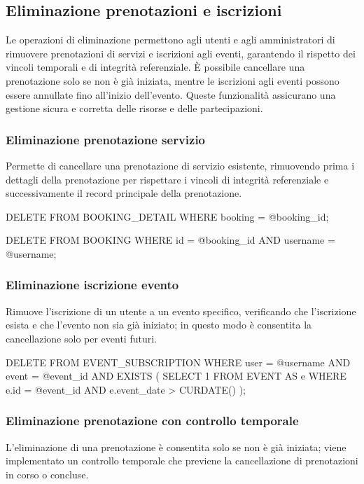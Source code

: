 \documentclass[a4paper,12pt]{report}
\begin{document}
\newpage
\subsection{Eliminazione prenotazioni e iscrizioni}
Le operazioni di eliminazione permettono agli utenti e agli
amministratori di rimuovere prenotazioni di servizi e iscrizioni agli
eventi, garantendo il rispetto dei vincoli temporali e di integrità
referenziale. È possibile cancellare una prenotazione solo se non è
già iniziata, mentre le iscrizioni agli eventi possono essere
annullate fino all'inizio dell'evento. Queste funzionalità assicurano
una gestione sicura e corretta delle risorse e delle partecipazioni.

\subsubsection{Eliminazione prenotazione servizio}
Permette di cancellare una prenotazione di servizio esistente,
rimuovendo prima i dettagli della prenotazione per rispettare i
vincoli di integrità referenziale e successivamente il record
principale della prenotazione.

\begin{sqlcode}[caption={}]
DELETE FROM BOOKING_DETAIL
WHERE booking = @booking_id;

DELETE FROM BOOKING
WHERE id = @booking_id
AND username = @username;
\end{sqlcode}

\subsubsection{Eliminazione iscrizione evento}
Rimuove l'iscrizione di un utente a un evento specifico, verificando
che l'iscrizione esista e che l'evento non sia già iniziato; in
questo modo è consentita la cancellazione solo per eventi futuri.

\begin{sqlcode}[caption={}]
DELETE FROM EVENT_SUBSCRIPTION
WHERE
  user = @username
  AND event = @event_id
  AND EXISTS (
    SELECT 1
    FROM EVENT AS e
    WHERE
      e.id = @event_id
      AND e.event_date > CURDATE()
  );
\end{sqlcode}

\subsubsection{Eliminazione prenotazione con controllo temporale}
L'eliminazione di una prenotazione è consentita solo se non è già
iniziata; viene implementato un controllo temporale che previene la
cancellazione di prenotazioni in corso o concluse.
\end{document}
